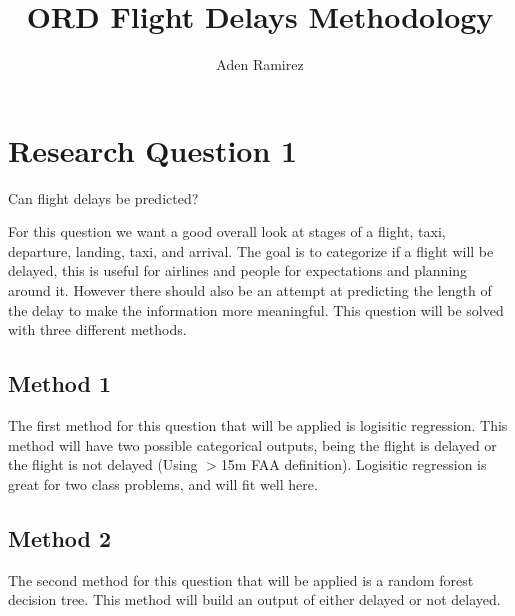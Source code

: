 \documentclass[a4paper,12pt]{article}
\begin{document}
\title{ORD Flight Delays Methodology}
\author{Aden Ramirez}
\maketitle

\pagebreak

\section{Research Question 1}
Can flight delays be predicted?

For this question we want a good overall look at stages of a flight, taxi, departure, landing, taxi, and arrival. The goal is to categorize if a flight will be delayed,
this is useful for airlines and people for expectations and planning around it. However there should also be an attempt at predicting the length of the delay to make 
the information more meaningful. This question will be solved with three different methods.

\subsection{Method 1}

The first method for this question that will be applied is logisitic regression. This method will have two possible categorical outputs, being the flight is delayed
or the flight is not delayed (Using $>$15m FAA definition). Logisitic regression is great for two class problems, and will fit well here.

\subsection{Method 2}
The second method for this question that will be applied is a random forest decision tree. This method will build an output of either delayed or not delayed.

\end{document}
